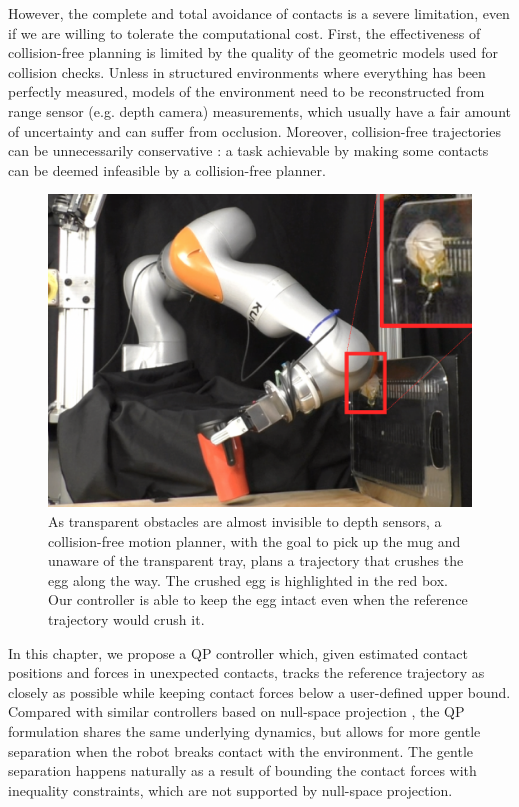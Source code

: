 However, the complete and total avoidance of contacts is a severe limitation, even if we are willing to tolerate the computational cost. First, the effectiveness of collision-free planning is limited by the quality of the geometric models used for collision checks. Unless in structured environments where everything has been perfectly measured, models of the environment need to be reconstructed from range sensor (e.g. depth camera) measurements, which usually have a fair amount of uncertainty and can suffer from occlusion. Moreover, collision-free trajectories can be unnecessarily conservative \cite{mason2018toward}: a task achievable by making some contacts can be deemed infeasible by a collision-free planner. 
\begin{figure}
    \centering
    \includegraphics[width=0.65\linewidth]{figures/04_control/figure1.png}
    \caption{As transparent obstacles are almost invisible to depth sensors, a collision-free motion planner, with the goal to pick up the mug and unaware of the transparent tray, plans a trajectory that crushes the egg along the way. The crushed egg is highlighted in the red box. Our controller is able to keep the egg intact even when the reference trajectory would crush it.}
    \label{fig:contact_crushes_egg}
\end{figure}

In this chapter, we propose a QP controller which, given estimated contact positions and forces in unexpected contacts, tracks the reference trajectory as closely as possible while keeping contact forces below a user-defined upper bound.
Compared with similar controllers based on null-space projection \cite{nakamura1987task, siciliano1991general, aghili2005unified, dehio2018modeling, jorda2019contact}, the QP formulation shares the same underlying dynamics, but allows for more gentle separation when the robot breaks contact with the environment. The gentle separation happens naturally as a result of bounding the contact forces with inequality constraints, which are not supported by null-space projection.

